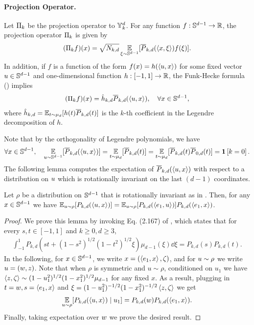 \paragraph{Projection Operator.}
Let $\Pi_k$ be the projection operator to $\mathbb{Y}_{k}^{d}$. For any function $f:\mathbb{S}^{d-1}\to \mathbb{R}$, the projection operator $\Pi_k$ is given by 
\begin{align}
    (\Pi_k f)(x)=\sqrt{N_{k,d}}\operatorname*{\mathbb{E}}_{\xi\sim \mathbb{S}^{d-1}}[\overline{P}_{k,d}(\left<x, \xi\right>)f(\xi)].
\end{align}
In addition, if $f$ is a function of the form $f(x)=h(\left<u, x\right>)$ for some fixed vector $u\in\mathbb{S}^{d-1}$ and one-dimensional function $h:[-1,1]\to \mathbb{R}$, the Funk-Hecke formula () implies
\begin{align}
    (\Pi_k f)(x)=\hat{h}_{k, d} \overline{P}_{k,d}(\left<u, x\right>),\quad\forall x\in\mathbb{S}^{d-1},
\end{align}
where $\hat{h}_{k, d}=\operatorname*{\mathbb{E}}_{t\sim \mu_d}[h(t)\overline{P}_{k, d}(t)]$ is the $k$-th coefficient in the Legendre decomposition of $h$.



Note that by the orthogonality of Legendre polynomials, we have
\begin{align}
    \forall x\in\mathbb{S}^{d-1},\quad \operatorname*{\mathbb{E}}_{u\sim \mathbb{S}^{d-1}}[\overline{P}_{k,d}(\left<u, x\right>)]=\operatorname*{\mathbb{E}}_{t\sim \mu_d}[\overline{P}_{k,d}(t)]=\operatorname*{\mathbb{E}}_{t\sim \mu_d}[\overline{P}_{k,d}(t)\overline{P}_{0,d}(t)]=\mathbf{1}\left[ k=0 \right].
\end{align}
The following lemma computes the expectation of $\overline{P}_{k,d}(\left<u, x\right>)$ with respect to a distribution on $u$ which is rotationally invariant on the last $(d - 1)$ coordinates.

\begin{lemma} \label{lemma:1d_rotational_invariance}
Let $\rho$ be a distribution on $\mathbb{S}^{d - 1}$ that is rotationally invariant as in . Then, for any $x\in\mathbb{S}^{d-1}$ we have $\operatorname*{\mathbb{E}}_{u \sim \rho}[P_{k, d}(\left<u, x\right>)] = \operatorname*{\mathbb{E}}_{u \sim \rho} [P_{k, d}(\left<e_1, u\right>)] P_{k, d}(\left<e_1, x\right>)$.
\end{lemma}
\begin{proof}
    We prove this lemma by invoking Eq. (2.167) of \citet{atkinson2012spherical}, which states that for every $s,t\in[-1,1]$ and $k\ge 0,d\ge 3$,
    \begin{align}
        \int_{-1}^{1}P_{k,d}(st+(1-s^2)^{1/2}(1-t^2)^{1/2}\xi)\mu_{d-1}(\xi)\dd \xi=P_{k,d}(s)P_{k,d}(t).
    \end{align} 
    In the following, for $x \in \mathbb{S}^{d - 1}$, we write $x = (\left<e_1, x\right>, \zeta)$, and for $u \sim \rho$ we write $u = (w, z)$. Note that when $\rho$ is symmetric and $u\sim \rho$, conditioned on $u_1$ we have $\left<z, \zeta\right>\sim (1-u_1^2)^{1/2}(1-x_1^2)^{1/2}\mu_{d-1}$ for any fixed $x$. As a result,
    plugging in $t=w,s=\left<e_1, x\right>$ and $\xi=(1-u_1^2)^{-1/2}(1-x_1^2)^{-1/2}\left<z, \zeta\right>$ we get
    \begin{align}
        \operatorname*{\mathbb{E}}_{u\sim \rho}[P_{k, d}(\left<u, x\right>)\mid u_1]=P_{k, d}(w) P_{k, d}(\left<e_1, x\right>).
    \end{align}
    Finally, taking expectation over $w$ we prove the desired result.
\end{proof}

